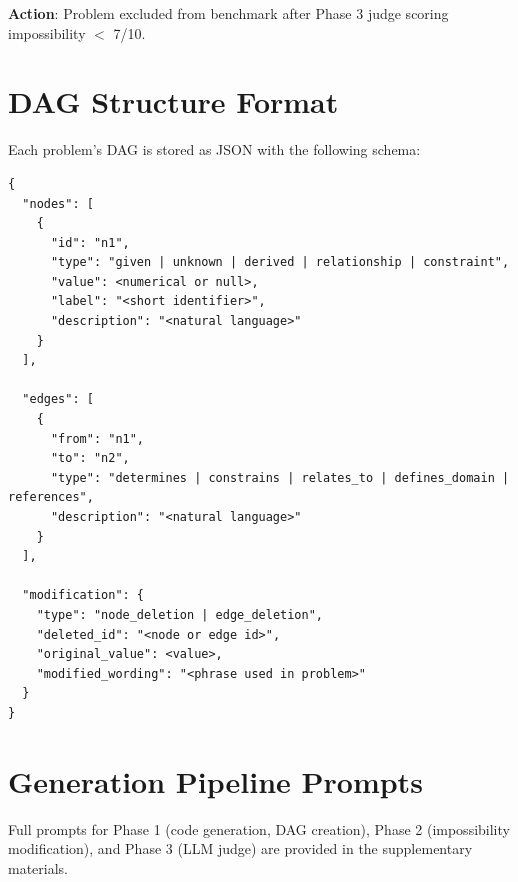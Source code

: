 \documentclass{article} %
\begin{document}
\textbf{Action}: Problem excluded from benchmark after Phase 3 judge scoring impossibility $<$ 7/10.

\section{DAG Structure Format}
\label{app:dag}

Each problem's DAG is stored as JSON with the following schema:
\begin{verbatim}
{
  "nodes": [
    {
      "id": "n1",
      "type": "given | unknown | derived | relationship | constraint",
      "value": <numerical or null>,
      "label": "<short identifier>",
      "description": "<natural language>"
    }
  ],

  "edges": [
    {
      "from": "n1",
      "to": "n2",
      "type": "determines | constrains | relates_to | defines_domain | references",
      "description": "<natural language>"
    }
  ],

  "modification": {
    "type": "node_deletion | edge_deletion",
    "deleted_id": "<node or edge id>",
    "original_value": <value>,
    "modified_wording": "<phrase used in problem>"
  }
}
\end{verbatim}

\section{Generation Pipeline Prompts}
\label{app:prompts}

Full prompts for Phase 1 (code generation, DAG creation), Phase 2 (impossibility modification), and Phase 3 (LLM judge) are provided in the supplementary materials.
\end{document}
